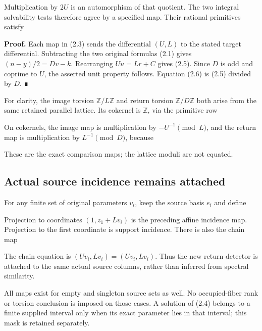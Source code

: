 Multiplication by \(2U\) is an automorphism of that quotient. The two
integral solvability tests therefore agree by a specified map. Their
rational primitives satisfy


\textbf{Proof.} Each map in (2.3) sends the differential \((U,L)\) to
the stated target differential. Subtracting the two original formulas
(2.1) gives \((n-y)/2=Dv-k\). Rearranging \(Uu=Lr+C\) gives (2.5). Since
\(D\) is odd and coprime to \(U\), the asserted unit property follows.
Equation (2.6) is (2.5) divided by \(D\). ∎

For clarity, the image torsion \(\mathbb Z/L\mathbb Z\) and return
torsion \(\mathbb Z/D\mathbb Z\) both arise from the same retained
parallel lattice. Its cokernel is \(\mathbb Z\), via the primitive row


On cokernels, the image map is multiplication by \(-U^{-1}\pmod L\), and
the return map is multiplication by \(L^{-1}\pmod D\), because


These are the exact comparison maps; the lattice moduli are not equated.

\subsection{Actual source incidence remains attached}

For any finite set of original parameters \(v_i\), keep the source basis
\(e_i\) and define


Projection to coordinates \((1,z_1+Lv_i)\) is the preceding affine
incidence map. Projection to the first coordinate is support incidence.
There is also the chain map


The chain equation is \((Uv_i,Lv_i)=(Uv_i,Lv_i)\). Thus the new return
detector is attached to the same actual source columns, rather than
inferred from spectral similarity.

All maps exist for empty and singleton source sets as well. No
occupied-fiber rank or torsion conclusion is imposed on those cases. A
solution of (2.4) belongs to a finite supplied interval only when its
exact parameter lies in that interval; this mask is retained separately.


